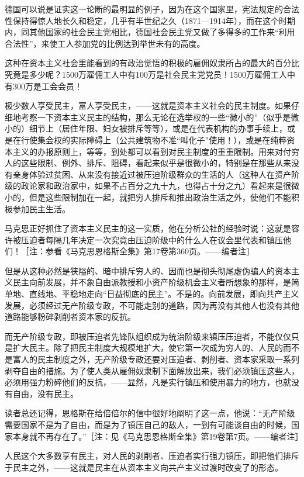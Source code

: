 \documentclass[UTF8, 12pt, a4paper]{ctexrep}
\begin{document}
德国可以说是证实这一论断的最明显的例子，因为在这个国家里，宪法规定的合法性保持得惊人地长久和稳定，几乎有半世纪之久（1871—1914年），而在这个时期内，同其他国家的社会民主党相比，德国社会民主党又做了多得多的工作来“利用合法性”，来使工人参加党的比例达到举世未有的高度。

这种在资本主义社会里能看到的有政治觉悟的积极的雇佣奴隶所占的最大的百分比究竟是多少呢？1500万雇佣工人中有100万是社会民主党党员！1500万雇佣工人中有300万是工会会员！

极少数人享受民主，富人享受民主，——这就是资本主义社会的民主制度。如果仔细地考察一下资本主义民主的结构，那么无论在选举权的一些“微小的”（似乎是微小的）细节上（居住年限、妇女被排斥等等），或是在代表机构的办事手续上，或是在行使集会权的实际障碍上（公共建筑物不准“叫化子”使用！），或是在纯粹资本主义的办报原则上，等等，到处都可以看到对民主制度的重重限制。用来对付穷人的这些限制、例外、排斥、阻碍，看起来似乎是很微小的，特别是在那些从来没有亲身体验过贫困、从来没有接近过被压迫阶级群众的生活的人（这种人在资产阶级的政论家和政治家中，如果不占百分之九十九，也得占十分之九）看起来是很微小的，但是这些限制加在一起，就把穷人排斥和推出政治生活之外，使他们不能积极参加民主生活。

马克思正好抓住了资本主义民主的这一实质，他在分析公社的经验时说：这就是容许被压迫者每隔几年决定一次究竟由压迫阶级中的什么人在议会里代表和镇压他们！［注：参看《马克思恩格斯全集》第17卷第360页。——编者注］

但是从这种必然是狭隘的、暗中排斥穷人的、因而也是彻头彻尾虚伪骗人的资本主义民主向前发展，并不象自由派教授和小资产阶级机会主义者所想象的那样，是简单地、直线地、平稳地走向“日益彻底的民主”。不是的。向前发展，即向共产主义发展，必须经过无产阶级专政，不可能走别的道路，因为再没有其他人也没有其他道路能够粉碎剥削者资本家的反抗。

而无产阶级专政，即被压迫者先锋队组织成为统治阶级来镇压压迫者，不能仅仅只是扩大民主。除了把民主制度大规模地扩大，使它第一次成为穷人的、人民的而不是富人的民主制度之外，无产阶级专政还要对压迫者、剥削者、资本家采取一系列剥夺自由的措施。为了使人类从雇佣奴隶制下面解放出来，我们必须镇压这些人，必须用强力粉碎他们的反抗，——显然，凡是实行镇压和使用暴力的地方，也就没有自由，没有民主。

读者总还记得，恩格斯在给倍倍尔的信中很好地阐明了这一点，他说：“无产阶级需要国家不是为了自由，而是为了镇压自己的敌人，一到有可能谈自由的时候，国家本身就不再存在了。”［注：见《马克思恩格斯全集》第19卷第7页。——编者注］

人民这个大多数享有民主，对人民的剥削者、压迫者实行强力镇压，即把他们排斥于民主之外，——这就是民主在从资本主义向共产主义过渡时改变了的形态。
\end{document}
